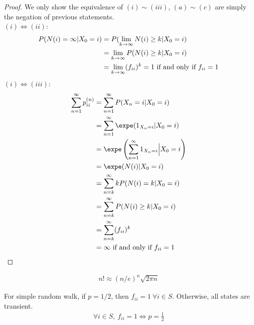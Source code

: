 \documentclass{article}
\begin{document}
    \begin{proof}
    	We only show the equivalence of $(i)\sim(iii)$, $(a)\sim(c)$ are simply the negation of previous statements. \\
    	$(i) \iff (ii)$:
    	\begin{align}
    		P(N(i) = \infty|X_0=i) &= P(\lim_{k \to \infty} N(i) \geq k| X_0=i) \\
    		&= \lim_{k \to \infty} P(N(i) \geq k| X_0=i) \\
    		&= \lim_{k \to \infty} (f_{ii})^k = 1 \text{{ if and only if }} f_{ii} = 1
    	\end{align}
    	$(i) \iff (iii)$:
    	\begin{align}
    		\sum_{n=1}^\infty p_{ii}^{(n)}
    		&= \sum_{n=1}^\infty P(X_n = i | X_0 = i) \\
    		&= \sum_{n=1}^\infty \expe (1_{X_n=i} | X_0 = i) \\
    		&= \expe \left(
    		\sum_{n=1}^\infty 1_{X_n=i} \Big| X_0 = i
    		\right ) \\
    		&= \expe (N(i) | X_0=i) \\
    		&= \sum_{n=k}^\infty k P(N(i)=k | X_0=i) \\
    		&= \sum_{n=k}^\infty P(N(i) \geq k | X_0=i) \\
    		&= \sum_{n=k}^\infty (f_{ii})^k \\
    		&= \infty \tx{ if and only if } f_{ii} = 1
    	\end{align}
    \end{proof}
    
    \begin{lemma}
    	\begin{align}
    		n! \approx (n/e)^n \sqrt{2\pi n}
    	\end{align}
    \end{lemma}
    
    \begin{proposition}
    	For simple random walk, if $p=1/2$, then $f_{ii} = 1\ \forall i \in S$. Otherwise, all states are transient.
    	\begin{align}
    		\forall i \in S,\ f_{ii} = 1 \iff p = \frac{1}{2}
    	\end{align}
    \end{proposition}
    
\end{document}
